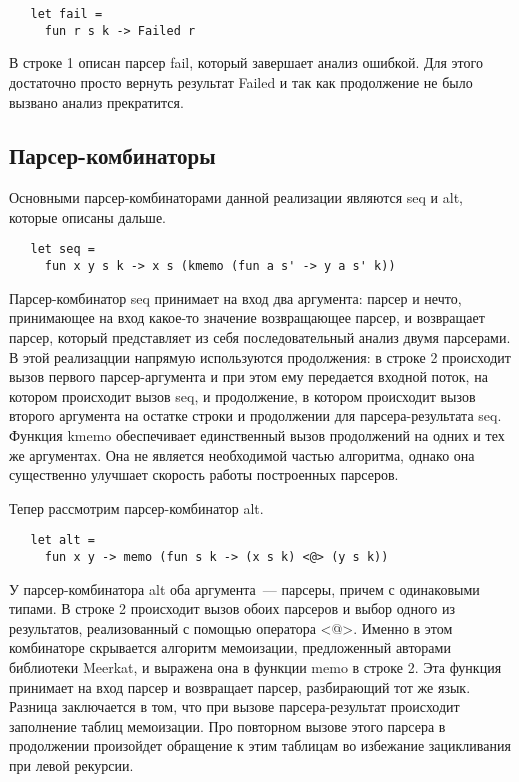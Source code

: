 \documentclass[conference]{IEEEtran}
\begin{document}
\begin{lstlisting}
   let fail =
     fun r s k -> Failed r
\end{lstlisting}

В строке 1 описан парсер fail, который завершает анализ ошибкой. Для этого достаточно просто вернуть результат Failed и так как продолжение не было вызвано анализ прекратится.

\subsection{Парсер-комбинаторы}
Основными парсер-комбинаторами данной реализации являются seq и alt, которые описаны дальше.

\begin{lstlisting}
   let seq =
     fun x y s k -> x s (kmemo (fun a s' -> y a s' k))
\end{lstlisting}

Парсер-комбинатор seq принимает на вход два аргумента: парсер и нечто, принимающее на вход какое-то значение возвращающее парсер, и возвращает парсер, который представляет из себя последовательный анализ двумя парсерами. В этой реализацции напрямую используются продолжения: в строке 2 происходит вызов первого парсер-аргумента и при этом ему передается входной поток, на котором происходит вызов seq, и продолжение, в котором происходит вызов второго аргумента на остатке строки и продолжении для парсера-результата seq. Функция kmemo обеспечивает единственный вызов продолжений на одних и тех же аргументах. Она не является необходимой частью алгоритма, однако она существенно улучшает скорость работы построенных парсеров.

Тепер рассмотрим парсер-комбинатор alt.

\begin{lstlisting}
   let alt =
     fun x y -> memo (fun s k -> (x s k) <@> (y s k))
\end{lstlisting}

У парсер-комбинатора alt оба аргумента~--- парсеры, причем с одинаковыми типами. В строке 2 происходит вызов обоих парсеров и выбор одного из результатов, реализованный с помощью оператора <@>. Именно в этом комбинаторе скрывается алгоритм мемоизации, предложенный авторами библиотеки Meerkat, и выражена она в функции memo в строке 2. Эта функция принимает на вход парсер и возвращает парсер, разбирающий тот же язык. Разница заключается в том, что при вызове парсера-результат происходит заполнение таблиц мемоизации. Про повторном вызове этого парсера в продолжении произойдет обращение к этим таблицам во избежание зацикливания при левой рекурсии.
\end{document}
